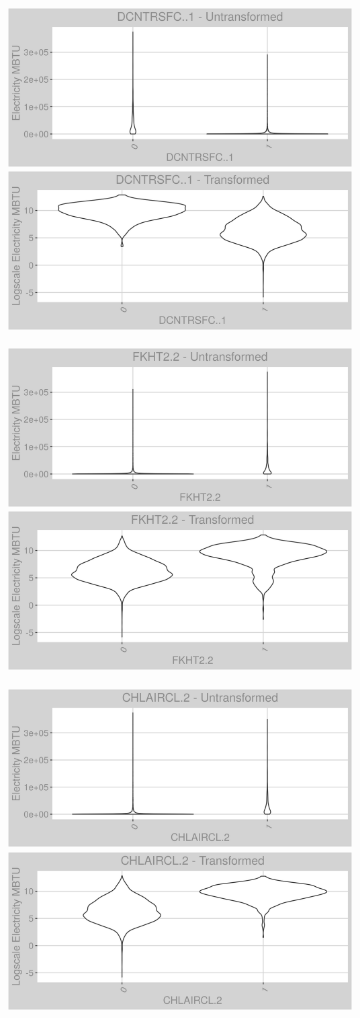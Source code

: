 \newpage
\begin{figure}
\centering
\begin{subfigure}{1\textwidth}
\centering
\includegraphics[width=.49\textwidth, height=0.3\textheight]{Images/electricity_var_original_17.png}
\includegraphics[width=.49\textwidth, height=0.3\textheight]{Images/electricity_var_transformed_17.png}
\end{subfigure}
\begin{subfigure}{1\textwidth}
\centering
\includegraphics[width=.49\textwidth, height=0.3\textheight]{Images/electricity_var_original_18.png}
\includegraphics[width=.49\textwidth, height=0.3\textheight]{Images/electricity_var_transformed_18.png}
\end{subfigure}
\begin{subfigure}{1\textwidth}
\centering
\includegraphics[width=.49\textwidth, height=0.3\textheight]{Images/electricity_var_original_19.png}
\includegraphics[width=.49\textwidth, height=0.3\textheight]{Images/electricity_var_transformed_19.png}
\end{subfigure}
\end{figure}
